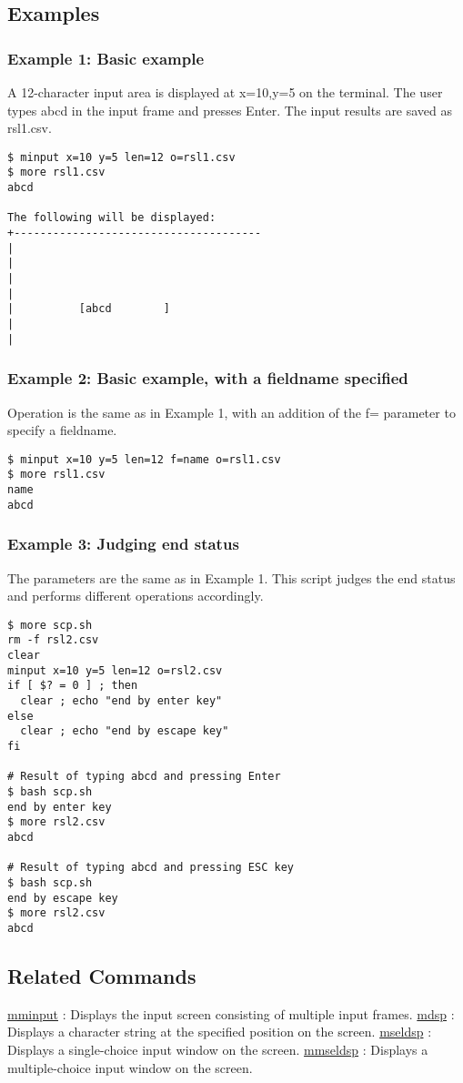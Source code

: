 \subsection*{Examples}

\subsubsection*{Example 1: Basic example}
A 12-character input area is displayed at x=10,y=5 on the terminal. The user types abcd in the input frame and presses Enter. The input results are saved as rsl1.csv.

\begin{Verbatim}[baselinestretch=0.7,frame=single]
$ minput x=10 y=5 len=12 o=rsl1.csv
$ more rsl1.csv
abcd

The following will be displayed:
+--------------------------------------
|
|
|
|
|          [abcd        ]
|
|
\end{Verbatim}

\subsubsection*{Example 2: Basic example, with a fieldname specified}
Operation is the same as in Example 1, with an addition of the f= parameter to specify a fieldname.

\begin{Verbatim}[baselinestretch=0.7,frame=single]
$ minput x=10 y=5 len=12 f=name o=rsl1.csv
$ more rsl1.csv
name
abcd
\end{Verbatim}


\subsubsection*{Example 3: Judging end status}
The parameters are the same as in Example 1. This script judges the end status and performs different operations accordingly.

\begin{Verbatim}[baselinestretch=0.7,frame=single]
$ more scp.sh
rm -f rsl2.csv
clear
minput x=10 y=5 len=12 o=rsl2.csv
if [ $? = 0 ] ; then
  clear ; echo "end by enter key"
else
  clear ; echo "end by escape key"
fi

# Result of typing abcd and pressing Enter
$ bash scp.sh
end by enter key
$ more rsl2.csv
abcd

# Result of typing abcd and pressing ESC key
$ bash scp.sh
end by escape key
$ more rsl2.csv
abcd
\end{Verbatim}

\subsection*{Related Commands}
\hyperref[sect:mminput] {mminput} : Displays the input screen consisting of multiple input frames.
\hyperref[sect:mdsp] {mdsp} : Displays a character string at the specified position on the screen.
\hyperref[sect:mseldsp] {mseldsp} : Displays a single-choice input window on the screen.
\hyperref[sect:mmseldsp] {mmseldsp} : Displays a multiple-choice input window on the screen.

%
